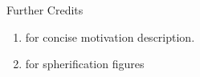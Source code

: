 \documentclass{beamer}
\newcommand{\todo}[1]{\textit{\textcolor{red}{#1}}}
\begin{document}
\begin{frame}{Further Credits}
\begin{enumerate}
\item \cite{annurev:sbmp} for concise motivation description.
\item \cite{paper:cuRobo} for spherification figures
\end{enumerate}
\end{frame}

%
\end{document}
